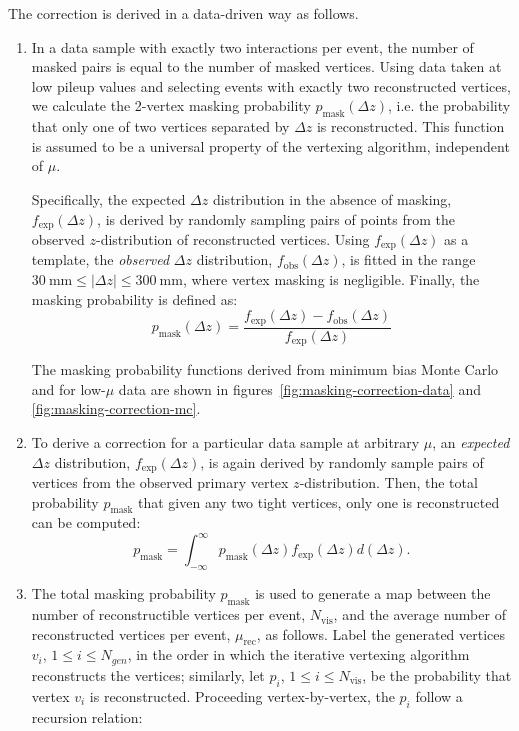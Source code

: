 The correction is derived in a data-driven way as follows. 
\begin{enumerate}
	\item In a data sample with exactly two interactions per event, the number of masked pairs is equal to the number of masked vertices. Using data taken at low pileup values and selecting events with exactly two reconstructed vertices, we calculate the 2-vertex masking probability $p_{\textrm{mask}}(\Delta z)$, i.e. the probability that only one of two vertices separated by $\Delta z$ is reconstructed. This function is assumed to be a universal property of the vertexing algorithm, independent of $\mu$. 
	
	Specifically, the expected $\Delta z$ distribution in the absence of masking, $f_{\mathrm{exp}}(\Delta z)$, is derived by randomly sampling pairs of points from the observed $z$-distribution of reconstructed vertices. Using $f_{\mathrm{exp}}(\Delta z)$ as a template, the \emph{observed} $\Delta z$ distribution, $f_{\mathrm{obs}}(\Delta z)$, is fitted in the range $\SI{30}{\milli\meter}\leq|\Delta z| \leq \SI{300}{\milli\meter}$, where vertex masking is negligible. Finally, the masking probability is defined as:
	\begin{equation}
		p_{\textrm{mask}}(\Delta z) = \frac{f_{\mathrm{exp}}(\Delta z) - f_{\mathrm{obs}}(\Delta z)}{f_{\mathrm{exp}}(\Delta z)}
	\end{equation}
	
	The masking probability functions derived from minimum bias Monte Carlo and for low-$\mu$ data are shown in figures~\ref{fig:masking-correction-data} and \ref{fig:masking-correction-mc}.
		
	\item To derive a correction for a particular data sample at arbitrary $\mu$, an \emph{expected} $\Delta z$ distribution, $f_{\mathrm{exp}}(\Delta z)$, is again derived by randomly sample pairs of vertices from the observed primary vertex $z$-distribution. Then, the total probability $p_{\textrm{mask}}$ that given any two tight vertices, only one is reconstructed can be computed: 
	\begin{equation}
		p_{\textrm{mask}} = \int_{-\infty}^{\infty} p_{\textrm{mask}}(\Delta z) f_{\mathrm{exp}}(\Delta z) d(\Delta z).
	\end{equation}
	
	\item The total masking probability $p_{\textrm{mask}}$ is used to generate a map between the number of reconstructible vertices per event, $N_{\textrm{vis}}$, and the average number of reconstructed vertices per event, $\mu_{\textrm{rec}}$, as follows. Label the generated vertices $v_i$, $1 \leq i \leq N_{gen}$, in the order in which the iterative vertexing algorithm reconstructs the vertices; similarly, let $p_i$, $1\leq i \leq N_{\textrm{vis}}$, be the probability that vertex $v_i$ is reconstructed. Proceeding vertex-by-vertex, the $p_i$ follow a recursion relation:


\end{enumerate}
